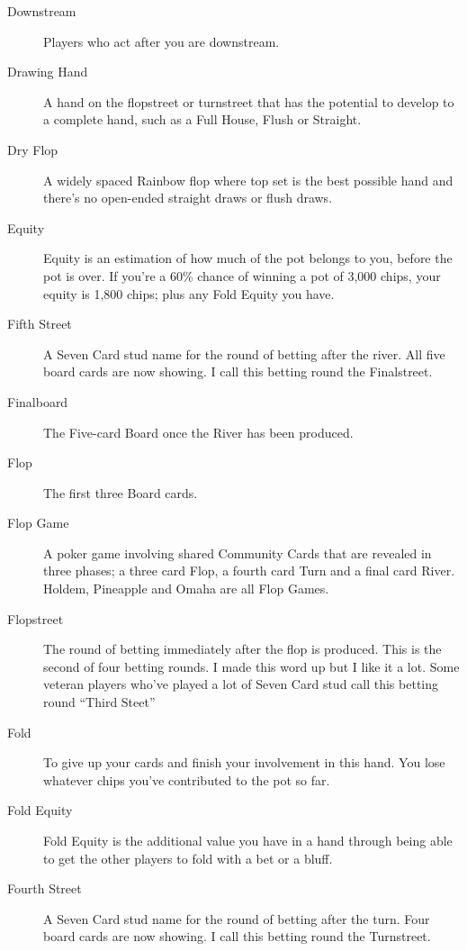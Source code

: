 \begin{description}
\item[Downstream] Players who act after you are downstream.

\item[Drawing Hand] A hand on the flopstreet or turnstreet that has
the potential to develop to a complete hand, such as a Full House,
Flush or Straight.

\item[Dry Flop] A widely spaced Rainbow flop where top set is the best
possible hand and there's no open-ended straight draws or flush
draws.

\item[Equity] Equity is an estimation of how much of the pot belongs
to you, before the pot is over. If you're a 60\% chance of winning a
pot of 3,000 chips, your equity is 1,800 chips; plus any Fold Equity
you have.

\item[Fifth Street] A Seven Card stud name for the round of betting
after the river. All five board cards are now showing. I call this betting
round the Finalstreet.

\item[Finalboard] The Five-card Board once the River has been
produced.

\item[Flop] The first three Board cards.

\item[Flop Game] A poker game involving shared Community Cards that
are revealed in three phases; a three card Flop, a fourth card Turn
and a final card River. Holdem, Pineapple and Omaha are all Flop
Games.

\item[Flopstreet] The round of betting immediately after the flop is
produced. This is the second of four betting rounds. I made this word
up but I like it a lot. Some veteran players who've played a lot of
Seven Card stud call this betting round ``Third Steet''

\item[Fold] To give up your cards and finish your involvement in this
hand. You lose whatever chips you've contributed to the pot so far.

\item[Fold Equity] Fold Equity is the additional value you have in a
hand through being able to get the other players to fold with a bet or
a bluff.

\item[Fourth Street] A Seven Card stud name for the round of betting
after the turn. Four board cards are now showing. I call this betting
round the Turnstreet.


\end{description}
